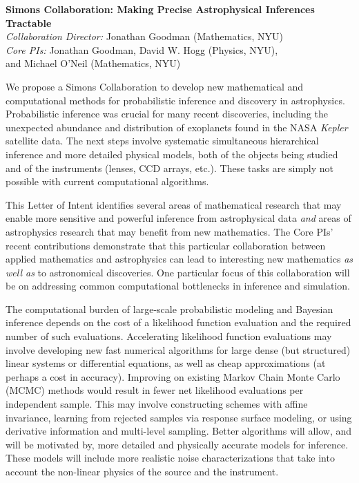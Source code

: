 \documentclass[11pt]{article}
\newcommand{\project}[1]{\textsl{#1}}
\begin{document}
\sloppy\sloppypar\thispagestyle{empty}

\begin{center}
\textbf{Simons Collaboration: Making Precise Astrophysical Inferences
Tractable}\\
\textit{Collaboration Director:} Jonathan Goodman (Mathematics, NYU)\\
\textit{Core PIs:} Jonathan Goodman, David W. Hogg (Physics, NYU),\\ and
Michael O'Neil (Mathematics, NYU)
\end{center}
\smallskip

We propose a Simons Collaboration to develop new mathematical and computational 
methods for probabilistic inference and discovery in astrophysics.
Probabilistic inference was crucial for many recent discoveries,
including the unexpected abundance and distribution of
exoplanets found in the NASA \project{Kepler} satellite data.
The next steps involve systematic simultaneous hierarchical inference
and more detailed physical models, both of the objects being studied and of
the instruments (lenses, CCD arrays, etc.).
These tasks are simply not possible with current computational algorithms.

This Letter of Intent identifies several areas of mathematical research
that may enable more sensitive and powerful inference from astrophysical
data {\em and} areas of astrophysics research that may benefit from new
mathematics.
The Core PIs' recent contributions demonstrate that this particular
collaboration between applied mathematics and astrophysics can lead to
interesting new mathematics {\em as well as} to astronomical
discoveries.
One particular focus of this collaboration will be on addressing
common computational bottlenecks in inference and simulation.

The computational burden of large-scale probabilistic modeling and
Bayesian inference depends on the cost of a likelihood function
evaluation and the required number of such evaluations.
Accelerating likelihood function evaluations may involve developing new
fast numerical algorithms for large dense (but structured) linear systems
or differential equations, as well as cheap approximations (at perhaps a
cost in accuracy).
Improving on existing Markov Chain Monte Carlo (MCMC) methods would
result in fewer net likelihood evaluations per independent sample.
This may involve constructing schemes with affine invariance, learning
from rejected samples via response surface modeling, or using derivative
information and multi-level sampling.
Better algorithms will allow, and will be motivated by, more detailed and
physically accurate models for inference.
These models will include more realistic noise characterizations
that take into
account the non-linear physics of the source and the instrument.
\end{document}
